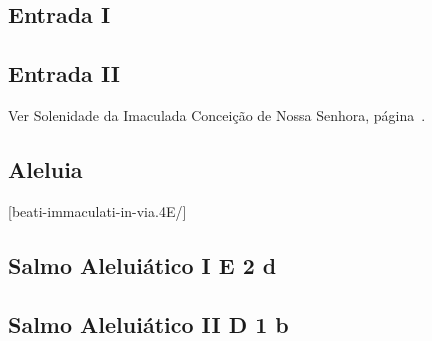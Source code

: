 \def\Prefix{communia/commune-sanctarum/}

\subsection{Entrada I}\label{subsection:communia/commune-sanctarum/introitus-1}

\AllowPageFlush

\subsection{Entrada II}\label{subsection:communia/commune-sanctarum/introitus-2}

\begin{rubrica}
  Ver Solenidade da Imaculada Conceição de Nossa Senhora, página~\pageref{subsection:proprium-sanctorum/in-conceptione-immaculata-bmv/psalmus-responsorius}.
\end{rubrica}

\subsection{Aleluia}\label{subsection:communia/commune-sanctarum/alleluia}
[beati-immaculati-in-via.4E/]

\AllowPageFlush

\subsection[Salmo Aleluiático I]{Salmo Aleluiático I \textmd{E 2 d}}\label{subsection:communia/commune-sanctarum/psalmus-alleluiaticus-1}

\AllowPageFlush

\subsection[Salmo Aleluiático I]{Salmo Aleluiático II \textmd{D 1 b}}\label{subsection:communia/commune-sanctarum/psalmus-alleluiaticus-2}

